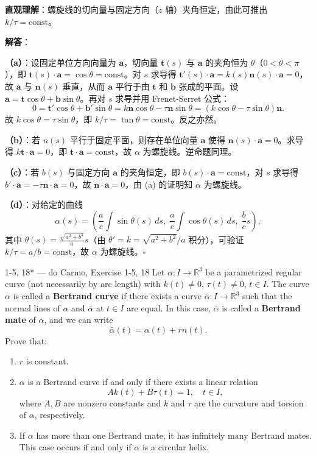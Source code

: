 \begin{solution}
\textbf{直观理解}：螺旋线的切向量与固定方向（$z$ 轴）夹角恒定，由此可推出 $k/\tau = \text{const}$。

\textbf{解答}：

\textbf{（a）}：设固定单位方向向量为 $\mathbf{a}$，切向量 $\mathbf{t}(s)$ 与 $\mathbf{a}$ 的夹角恒为 $\theta$（$0 < \theta < \pi$），即 $\mathbf{t}(s)\cdot\mathbf{a} = \cos\theta = \text{const}$。对 $s$ 求导得 $\mathbf{t}'(s)\cdot\mathbf{a} = k(s)\mathbf{n}(s)\cdot\mathbf{a} = 0$，故 $\mathbf{a}$ 与 $\mathbf{n}(s)$ 垂直，从而 $\mathbf{a}$ 平行于由 $\mathbf{t}$ 和 $\mathbf{b}$ 张成的平面。设 $\mathbf{a} = \mathbf{t}\cos\theta + \mathbf{b}\sin\theta$。再对 $s$ 求导并用 Frenet-Serret 公式：
\[
0 = \mathbf{t}'\cos\theta + \mathbf{b}'\sin\theta = k\mathbf{n}\cos\theta - \tau\mathbf{n}\sin\theta = (k\cos\theta - \tau\sin\theta)\mathbf{n}.
\]
故 $k\cos\theta = \tau\sin\theta$，即 $k/\tau = \tan\theta = \text{const}$。反之亦然。

\textbf{（b）}：若 $n(s)$ 平行于固定平面，则存在单位向量 $\mathbf{a}$ 使得 $\mathbf{n}(s)\cdot\mathbf{a} = 0$。求导得 $k\mathbf{t}\cdot\mathbf{a} = 0$，即 $\mathbf{t}\cdot\mathbf{a} = \text{const}$，故 $\alpha$ 为螺旋线。逆命题同理。

\textbf{（c）}：若 $b(s)$ 与固定方向 $\mathbf{a}$ 的夹角恒定，即 $b(s)\cdot\mathbf{a} = \text{const}$，对 $s$ 求导得 $b'\cdot\mathbf{a} = -\tau\mathbf{n}\cdot\mathbf{a} = 0$，故 $\mathbf{n}\cdot\mathbf{a} = 0$，由 (a) 的证明知 $\alpha$ 为螺旋线。

\textbf{（d）}：对给定的曲线
\[
\alpha(s) = \left(\frac{a}{c}\int\sin\theta(s)\,ds,\; \frac{a}{c}\int\cos\theta(s)\,ds,\; \frac{b}{c}s\right),
\]
其中 $\theta(s) = \frac{\sqrt{a^2+b^2}}{a}s$（由 $\theta' = k = \sqrt{a^2+b^2}/a$ 积分），可验证 $k/\tau = a/b = \text{const}$，故 $\alpha$ 为螺旋线。$\square$
\end{solution}

\begin{exercise}{1-5, 18* — do Carmo, Exercise 1-5, 18}
Let $\alpha: I \to \mathbb{R}^3$ be a parametrized regular curve (not necessarily by arc length) with $k(t) \neq 0$, $\tau(t) \neq 0$, $t \in I$. The curve $\alpha$ is called a \textbf{Bertrand curve} if there exists a curve $\bar{\alpha}: I \to \mathbb{R}^3$ such that the normal lines of $\alpha$ and $\bar{\alpha}$ at $t \in I$ are equal. In this case, $\bar{\alpha}$ is called a \textbf{Bertrand mate} of $\alpha$, and we can write
\[
\bar{\alpha}(t) = \alpha(t) + r n(t).
\]
Prove that:
\begin{enumerate}
\item[a.] $r$ is constant.
\item[b.] $\alpha$ is a Bertrand curve if and only if there exists a linear relation
\[
Ak(t) + B\tau(t) = 1, \quad t \in I,
\]
where $A, B$ are nonzero constants and $k$ and $\tau$ are the curvature and torsion of $\alpha$, respectively.
\item[c.] If $\alpha$ has more than one Bertrand mate, it has infinitely many Bertrand mates. This case occurs if and only if $\alpha$ is a circular helix.
\end{enumerate}
\end{exercise}

